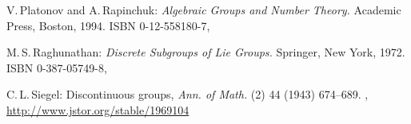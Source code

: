 \begin{references}{9}
 V.\,Platonov and A.\,Rapinchuk: 
 \emph{Algebraic Groups and Number Theory.}
 Academic Press, Boston, 1994.
 ISBN 0-12-558180-7,

 M.\,S.\,Raghunathan: 
 \emph{Discrete Subgroups of Lie Groups.}
 Springer, {New York}, 1972.
 ISBN 0-387-05749-8,

C.\,L.\,Siegel:
Discontinuous groups,
\emph{Ann. of Math.} (2) 44 (1943) 674--689. 
,
\url{http://www.jstor.org/stable/1969104}


\end{references}

